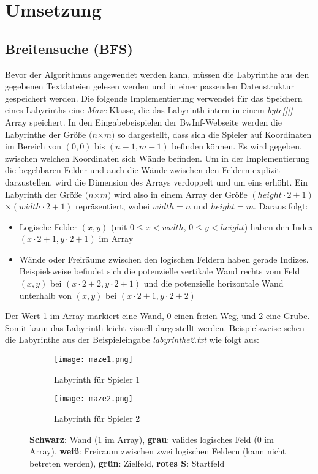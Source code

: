 \documentclass[a4paper,10pt,ngerman]{scrartcl}
\begin{document}
\section{Umsetzung}
\subsection{Breitensuche (BFS)}
Bevor der Algorithmus angewendet werden kann, müssen die Labyrinthe aus den gegebenen Textdateien gelesen werden und in einer passenden Datenstruktur gespeichert werden. Die folgende Implementierung verwendet für das Speichern eines Labyrinths eine \textit{Maze}-Klasse, die das Labyrinth intern in einem \textit{byte[][]}-Array speichert. In den Eingabebeispielen der BwInf-Webseite werden die Labyrinthe der Größe $(n$×$m)$ so dargestellt, dass sich die Spieler auf Koordinaten im Bereich von $(0,0)$ bis $(n-1, m-1)$ befinden können. Es wird gegeben, zwischen welchen Koordinaten sich Wände befinden. Um in der Implementierung die begehbaren Felder und auch die Wände zwischen den Feldern explizit darzustellen, wird die Dimension des Arrays verdoppelt und um eins erhöht. Ein Labyrinth der Größe $(n$×$m)$ wird also in einem Array der Größe $(height \cdot 2 + 1)$×$(width \cdot 2 + 1)$ repräsentiert, wobei $width = n$ und $height = m$. Daraus folgt: 
\begin{itemize}
  \item Logische Felder $(x,y)$ (mit $0 \le x < width$, $0 \le y < height$) haben den Index $(x \cdot 2 + 1, y \cdot 2 + 1)$ im Array 
  \item Wände oder Freiräume zwischen den logischen Feldern haben gerade Indizes. Beispielsweise befindet sich die potenzielle vertikale Wand rechts vom Feld $(x, y)$ bei $(x \cdot 2 + 2, y \cdot 2 + 1)$ und die potenzielle horizontale Wand unterhalb von $(x, y)$ bei $(x \cdot 2 + 1, y \cdot 2 + 2)$ 
\end{itemize}
Der Wert 1 im Array markiert eine Wand, 0 einen freien Weg, und 2 eine Grube. Somit kann das Labyrinth leicht visuell dargestellt werden. Beispielsweise sehen die Labyrinthe aus der Beispieleingabe \textit{labyrinthe2.txt} wie folgt aus: 
\begin{figure}[h!]
    \centering
    \begin{subfigure}{0.45\textwidth}
        \centering
        \texttt{[image: maze1.png]} 
        \caption{Labyrinth für Spieler 1}
        \label{fig:bild1}
    \end{subfigure}
    \hfill
    \begin{subfigure}{0.45\textwidth}
        \centering
        \texttt{[image: maze2.png]}
        \caption{Labyrinth für Spieler 2}
        \label{fig:bild2}
    \end{subfigure}
    \caption{\textbf{Schwarz}: Wand (1 im Array), \textbf{grau}: valides logisches Feld (0 im Array), \textbf{weiß}: Freiraum zwischen zwei logischen Feldern (kann nicht betreten werden), \textbf{grün}: Zielfeld, \textbf{rotes S}: Startfeld}
    \label{fig:gesamt}
\end{figure}
\end{document}
